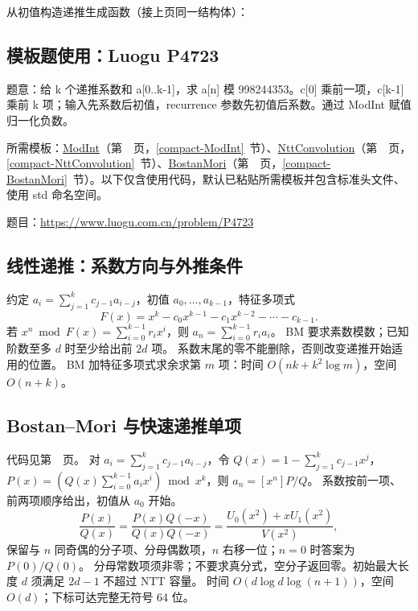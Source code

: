 \Needspace{387pt}



\newpage

\noindent 从初值构造递推生成函数（接上页同一结构体）：



\Needspace{408pt}

\subsection*{模板题使用：Luogu P4723}

\label{usage-example-49}

题意：给 k 个递推系数和 a[0..k-1]，求 a[n] 模 998244353。c[0] 乘前一项，c[k-1] 乘前 k 项；输入先系数后初值，recurrence 参数先初值后系数。通过 ModInt 赋值归一化负数。

所需模板：\hyperref[compact-ModInt]{ModInt}（第~\pageref{compact-ModInt}~页，\ref{compact-ModInt}~节）、\hyperref[compact-NttConvolution]{NttConvolution}（第~\pageref{compact-NttConvolution}~页，\ref{compact-NttConvolution}~节）、\hyperref[compact-BostanMori]{BostanMori}（第~\pageref{compact-BostanMori}~页，\ref{compact-BostanMori}~节）。以下仅含使用代码，默认已粘贴所需模板并包含标准头文件、使用 std 命名空间。

题目：\url{https://www.luogu.com.cn/problem/P4723}



\subsection{线性递推：系数方向与外推条件}\label{knowledge-recurrence-direction}
约定 $a_i=\sum_{j=1}^{k}c_{j-1}a_{i-j}$，初值 $a_0,\ldots,a_{k-1}$，特征多项式
\[
F(x)=x^k-c_0x^{k-1}-c_1x^{k-2}-\cdots-c_{k-1}.
\]
若 $x^n\bmod F(x)=\sum_{i=0}^{k-1}r_ix^i$，则 $a_n=\sum_{i=0}^{k-1}r_ia_i$。
BM 要求素数模数；已知阶数至多 $d$ 时至少给出前 $2d$ 项。
系数末尾的零不能删除，否则改变递推开始适用的位置。
BM 加特征多项式求余求第 $m$ 项：时间 $O(nk+k^2\log m)$，空间 $O(n+k)$。


\subsection{Bostan--Mori 与快速递推单项}\label{knowledge-bostan-mori}
代码见第~\pageref{compact-BostanMori}~页。
对 $a_i=\sum_{j=1}^k c_{j-1}a_{i-j}$，令
$Q(x)=1-\sum_{j=1}^k c_{j-1}x^j$，
$P(x)=(Q(x)\sum_{i=0}^{k-1}a_ix^i)\bmod x^k$，则 $a_n=[x^n]P/Q$。
系数按前一项、前两项顺序给出，初值从 $a_0$ 开始。
\[
 \frac{P(x)}{Q(x)}=\frac{P(x)Q(-x)}{Q(x)Q(-x)}
 =\frac{U_0(x^2)+xU_1(x^2)}{V(x^2)},
\]
保留与 $n$ 同奇偶的分子项、分母偶数项，$n$ 右移一位；$n=0$ 时答案为 $P(0)/Q(0)$。
分母常数项须非零；不要求真分式，空分子返回零。初始最大长度 $d$ 须满足 $2d-1$ 不超过 NTT 容量。
时间 $O(d\log d\log(n+1))$，空间 $O(d)$；下标可达完整无符号 64 位。

